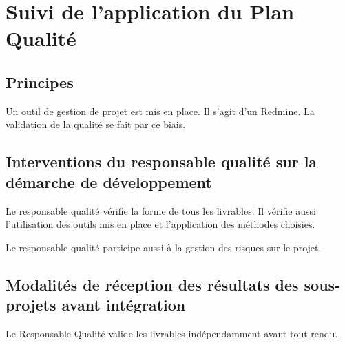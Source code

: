 \section{Suivi de l'application du Plan Qualité}

\subsection{Principes}
Un outil de gestion de projet est mis en place. Il s'agit d'un Redmine.
La validation de la qualité se fait par ce biais.

\subsection{Interventions du responsable qualité sur la démarche de développement}
Le responsable qualité vérifie la forme de tous les livrables. Il vérifie aussi l'utilisation des outils mis en place
et l'application des méthodes choisies.

Le responsable qualité participe aussi à la gestion des risques sur le projet.

\subsection{Modalités de réception des résultats des sous-projets avant intégration}
Le Responsable Qualité valide les livrables indépendamment avant tout rendu.

\vfill
\pagebreak
